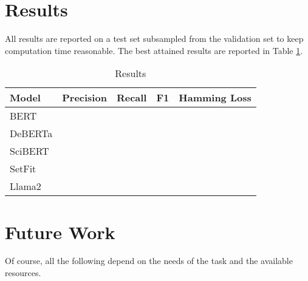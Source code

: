 \documentclass[10pt,letterpaper]{article}
\begin{document}
\section{Results}

All results are reported on a test set subsampled from the validation set to keep computation time reasonable. The best attained results are reported in Table \ref{tab:results}.

\begin{table}[h]
  \centering
  \caption{Results}
  \label{tab:results}
  \begin{tabular}{lcccc}
    \toprule
    Model & Precision & Recall & F1 & Hamming Loss \\
    \midrule
    BERT                                           \\
    DeBERTa                                        \\
    SciBERT                                        \\
    SetFit                                         \\
    Llama2                                         \\
    \bottomrule
  \end{tabular}
\end{table}

\section{Future Work}

Of course, all the following depend on the needs of the task and the available resources.
\end{document}
